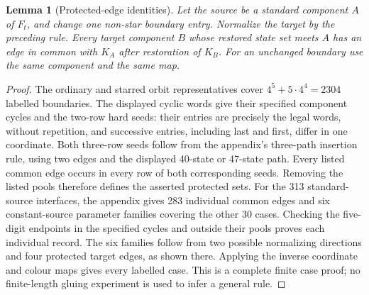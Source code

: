 \documentclass[11pt]{article}
\newtheorem{lemma}[theorem]{Lemma}
\theoremstyle{remark}
\numberwithin{equation}{section}
\numberwithin{table}{section}
\begin{document}
\begin{lemma}[Protected-edge identities]\label{lem:pentagon-protection}
Let the source be a standard component $A$ of $F_t$, and change one
non-star boundary entry. Normalize the target by the preceding rule.
Every target component $B$ whose restored state set meets $A$ has an
edge in common with $K_A$ after restoration of $K_B$.
For an unchanged boundary use the same component and the same map.
\end{lemma}
\begin{proof}
The ordinary and starred orbit representatives cover
$4^5+5\cdot4^4=2304$ labelled boundaries. The displayed cyclic words
give their specified component cycles and the two-row hard seeds:
their entries are precisely the legal words, without repetition,
and successive entries, including last and first, differ in one
coordinate. Both three-row seeds follow from the appendix's
three-path insertion rule, using two edges and the displayed
40-state or 47-state path. Every listed common edge occurs in
every row of both corresponding seeds.
Removing the listed pools therefore defines the asserted protected sets.
For the 313 standard-source interfaces, the appendix gives 283
individual common edges and six constant-source parameter families
covering the other 30 cases. Checking the five-digit endpoints in
the specified cycles and outside their pools proves each individual
record. The six families follow from two possible normalizing
directions and four protected target edges, as shown there. Applying
the inverse coordinate and colour maps gives every labelled case. This is a complete finite case proof;
no finite-length gluing experiment is used to infer a general rule.
\end{proof}
\end{document}
